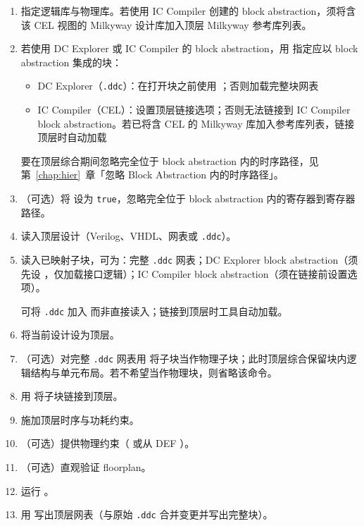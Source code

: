 \begin{enumerate}
  \item 指定逻辑库与物理库。若使用 IC Compiler 创建的 block abstraction，须将含该 CEL 视图的 Milkyway 设计库加入顶层 Milkyway 参考库列表。
  \item 若使用 DC Explorer 或 IC Compiler 的 block abstraction，用  指定应以 block abstraction 集成的块：
  \begin{itemize}
    \item DC Explorer（\texttt{.ddc}）：在打开块之前使用 ；否则加载完整块网表
    \item IC Compiler（CEL）：设置顶层链接选项；否则无法链接到 IC Compiler block abstraction。若已将含 CEL 的 Milkyway 库加入参考库列表，链接顶层时自动加载
  \end{itemize}
\begin{noteBox}
要在顶层综合期间忽略完全位于 block abstraction 内的时序路径，见第~\ref{chap:hier}~章「忽略 Block Abstraction 内的时序路径」。
\end{noteBox}
  \item （可选）将  设为 \texttt{true}，忽略完全位于 block abstraction 内的寄存器到寄存器路径。
  \item 读入顶层设计（Verilog、VHDL、网表或 \texttt{.ddc}）。
  \item 读入已映射子块，可为：完整 \texttt{.ddc} 网表；DC Explorer block abstraction（须先设 ，仅加载接口逻辑）；IC Compiler block abstraction（须在链接前设置选项）。
\begin{noteBox}
可将 \texttt{.ddc} 加入  而非直接读入；链接到顶层时工具自动加载。
\end{noteBox}
  \item 将当前设计设为顶层。
  \item （可选）对完整 \texttt{.ddc} 网表用  将子块当作物理子块；此时顶层综合保留块内逻辑结构与单元布局。若不希望当作物理块，则省略该命令。
  \item 用  将子块链接到顶层。
  \item 施加顶层时序与功耗约束。
  \item （可选）提供物理约束（ 或从 DEF ）。
  \item （可选）直观验证 floorplan。
  \item 运行 。
  \item 用  写出顶层网表（与原始 \texttt{.ddc} 合并变更并写出完整块）。
\end{enumerate}

